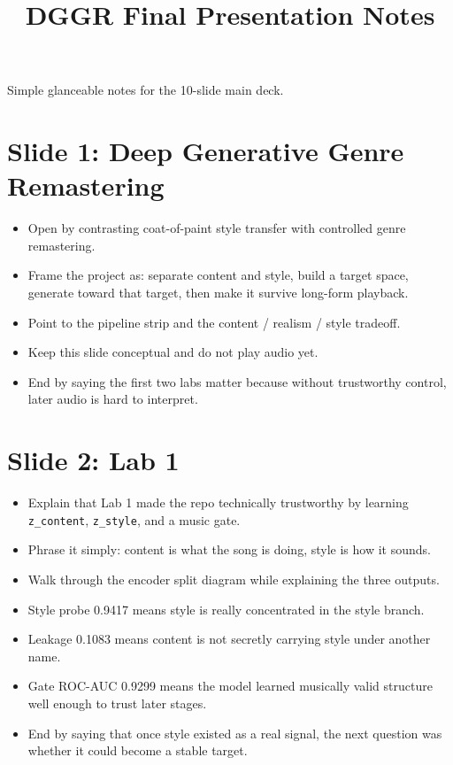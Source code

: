 \documentclass[11pt]{article}
\title{DGGR Final Presentation Notes}
\date{}
\begin{document}
\maketitle

Simple glanceable notes for the 10-slide main deck.

\section*{Slide 1: Deep Generative Genre Remastering}
\begin{itemize}
\item Open by contrasting coat-of-paint style transfer with controlled genre remastering.
\item Frame the project as: separate content and style, build a target space, generate toward that target, then make it survive long-form playback.
\item Point to the pipeline strip and the content / realism / style tradeoff.
\item Keep this slide conceptual and do not play audio yet.
\item End by saying the first two labs matter because without trustworthy control, later audio is hard to interpret.
\end{itemize}

\section*{Slide 2: Lab 1}
\begin{itemize}
\item Explain that Lab 1 made the repo technically trustworthy by learning \texttt{z\_content}, \texttt{z\_style}, and a music gate.
\item Phrase it simply: content is what the song is doing, style is how it sounds.
\item Walk through the encoder split diagram while explaining the three outputs.
\item Style probe 0.9417 means style is really concentrated in the style branch.
\item Leakage 0.1083 means content is not secretly carrying style under another name.
\item Gate ROC-AUC 0.9299 means the model learned musically valid structure well enough to trust later stages.
\item End by saying that once style existed as a real signal, the next question was whether it could become a stable target.
\end{itemize}
\end{document}
